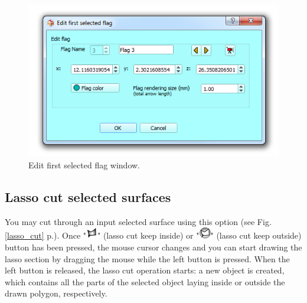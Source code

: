\begin{figure}
  \centering
  \includegraphics[scale=0.55]{images/06/objects/edit_flag.png} 
	\caption{Edit first selected flag window.}
\label{flag_edit}
 
\end{figure}

\subsection{Lasso cut selected surfaces} \label{lasso_cut_section}

You may cut through an input selected surface using this option (see Fig. \ref{lasso_cut} p.\pageref{lasso_cut}). Once "\includegraphics[scale=0.7]{images/06/objects/lasso_keepinside.png}" (lasso cut keep inside) or "\includegraphics[scale=0.7]{images/06/objects/lasso_keepoutside.png}" (lasso cut keep outside) button has been pressed, the mouse cursor changes and you can start drawing the lasso section by dragging the mouse while the left button is pressed. When the left button is released, the lasso cut operation starts: a new object is created, which contains all the parts of the selected object laying inside or outside the drawn polygon, respectively.\\

